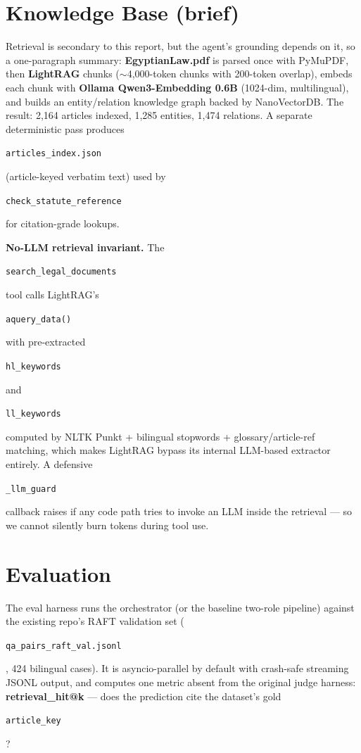 \documentclass[10pt,a4paper]{article}
\newcommand{\code}[1]{\colorbox{boxbg}{\strut\texttt{\small #1}}}
\begin{document}
\section{Knowledge Base (brief)}

Retrieval is secondary to this report, but the agent's grounding depends on it, so a one-paragraph summary: \textbf{EgyptianLaw.pdf} is parsed once with PyMuPDF, then \textbf{LightRAG} chunks ($\sim$4{,}000-token chunks with 200-token overlap), embeds each chunk with \textbf{Ollama Qwen3-Embedding 0.6B} (1024-dim, multilingual), and builds an entity/relation knowledge graph backed by NanoVectorDB. The result: 2{,}164 articles indexed, 1{,}285 entities, 1{,}474 relations. A separate deterministic pass produces \code{articles\_index.json} (article-keyed verbatim text) used by \code{check\_statute\_reference} for citation-grade lookups.

\smallskip
\noindent\textbf{No-LLM retrieval invariant.} The \code{search\_legal\_documents} tool calls LightRAG's \code{aquery\_data()} with pre-extracted \code{hl\_keywords} and \code{ll\_keywords} computed by NLTK Punkt + bilingual stopwords + glossary/article-ref matching, which makes LightRAG bypass its internal LLM-based extractor entirely. A defensive \code{\_llm\_guard} callback raises if any code path tries to invoke an LLM inside the retrieval — so we cannot silently burn tokens during tool use.

\section{Evaluation}

The eval harness runs the orchestrator (or the baseline two-role pipeline) against the existing repo's RAFT validation set (\code{qa\_pairs\_raft\_val.jsonl}, 424 bilingual cases). It is asyncio-parallel by default with crash-safe streaming JSONL output, and computes one metric absent from the original judge harness: \textbf{retrieval\_hit@k} — does the prediction cite the dataset's gold \code{article\_key}?
\end{document}
